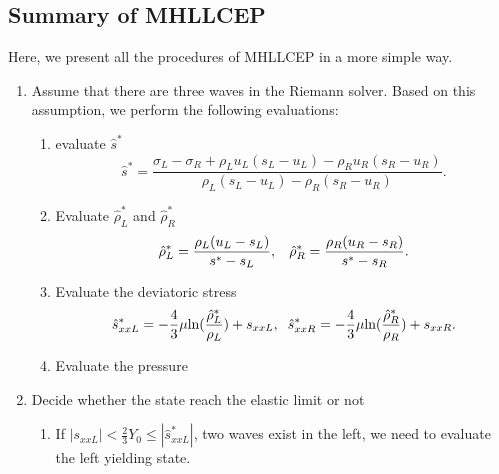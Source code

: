 \documentclass[review]{elsarticle}
\begin{document}
\subsection{Summary of MHLLCEP}
Here, we present all the procedures of MHLLCEP in a more simple way.
\begin{enumerate}
  \item  Assume  that there are three  waves in the Riemann solver. Based on this assumption, we perform the following evaluations:
  \begin{enumerate}
    \item evaluate  $\hat{s}^*$
    \begin{equation*}
       \hat{s}^* = \frac{\sigma_L-\sigma_R+\rho_L u_L(s_L-u_L)-\rho_R u_R(s_R-u_R)}{\rho_L(s_L-u_L)-\rho_R(s_R-u_R)}.
   \end{equation*}
    \item Evaluate  $\hat{\rho}_L^*$ and $\hat{\rho}_R^*$
    \begin{equation*}
       \hat{\rho}_L^* = \frac{\rho_L(u_L-s_L)}{s^*-s_L}, \hspace{0.3cm}  \hat{\rho}_R^* = \frac{\rho_R(u_R-s_R)}{s^*-s_R}.
    \end{equation*}
    \item Evaluate  the deviatoric stress
       \begin{equation*}
        \hat{s}_{xxL}^*=-\frac{4}{3}\mu\text{ln}(\frac{\hat{\rho}_L^*}{\rho_L})+s_{xxL},\hspace{0.2cm}  \hat{s}_{xxR}^*=-\frac{4}{3}\mu\text{ln}(\frac{\hat{\rho}_R^*}{\rho_R})+s_{xxR}.
      \end{equation*}
    \item Evaluate the pressure
  \end{enumerate}
  \item Decide whether the state reach the elastic limit or not
        \begin{enumerate}
          \item If $|s_{xxL}| < \frac{2}{3}Y_0 \le |\hat{s}_{xxL}^*| $, two  waves exist in the left, we need to  evaluate the left yielding state.


\end{enumerate}
\end{enumerate}
\end{document}
